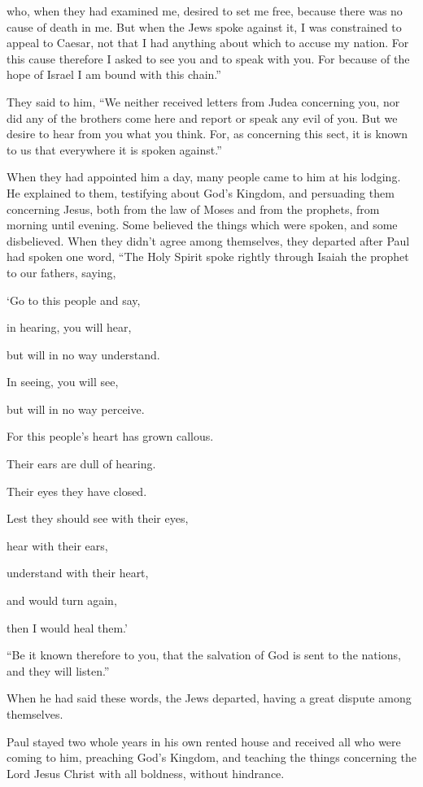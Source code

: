 {who, when they had examined me, desired to set me free, because there was no cause of death in me.
But when the Jews spoke against it, I was constrained to appeal to Caesar, not that I had anything about which to accuse my nation.
For this cause therefore I asked to see you and to speak with you. For because of the hope of Israel I am bound with this chain.”
\par }{\PP {}They said to him, “We neither received letters from Judea concerning you, nor did any of the brothers come here and report or speak any evil of you.
But we desire to hear from you what you think. For, as concerning this sect, it is known to us that everywhere it is spoken against.”
\par }{\PP {}When they had appointed him a day, many people came to him at his lodging. He explained to them, testifying about God’s Kingdom, and persuading them concerning Jesus, both from the law of Moses and from the prophets, from morning until evening.
Some believed the things which were spoken, and some disbelieved.
When they didn’t agree among themselves, they departed after Paul had spoken one word, “The Holy Spirit spoke rightly through Isaiah the prophet to our fathers,
saying,
\par }{\Q ‘Go to this people and say,
\par }{\Q in hearing, you will hear,
\par }{\QB but will in no way understand.
\par }{\Q In seeing, you will see,
\par }{\QB but will in no way perceive.
\par }{\Q {}For this people’s heart has grown callous.
\par }{\QB Their ears are dull of hearing.
\par }{\QB Their eyes they have closed.
\par }{\Q Lest they should see with their eyes,
\par }{\QB hear with their ears,
\par }{\QB understand with their heart,
\par }{\QB and would turn again,
\par }{\QB then I would heal them.’
\par }{\PP {}“Be it known therefore to you, that the salvation of God is sent to the nations, and they will listen.”
\par }{\PP {}When he had said these words, the Jews departed, having a great dispute among themselves.
\par }{\PP {}Paul stayed two whole years in his own rented house and received all who were coming to him,
preaching God’s Kingdom, and teaching the things concerning the Lord Jesus Christ with all boldness, without hindrance.
\par }